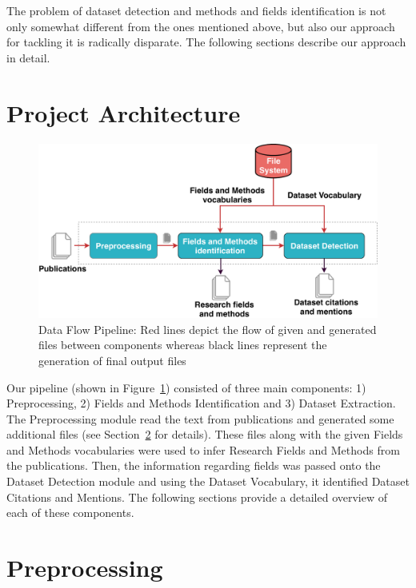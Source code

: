 \documentclass[runningheads]{llncs}
\begin{document}
The problem of dataset detection and methods and fields identification is not only somewhat different from the ones mentioned above, but also our approach for tackling it is radically disparate. The following sections describe our approach in detail.

\section{Project Architecture}

\begin{figure}[!htb]
    \centering
    \includegraphics[width=\textwidth]{images/flowchart_paper.pdf}
    \caption{Data Flow Pipeline: Red lines depict the flow of given and generated files between components whereas black lines represent the generation of final output files}
    \label{fig:flowchart}
\end{figure}

Our pipeline (shown in Figure~\ref{fig:flowchart}) consisted of three main components: 1) Preprocessing, 2) Fields and Methods Identification and 3) Dataset Extraction. The Preprocessing module read the text from publications and generated some additional files (see Section~\ref{preprocess} for details). These files along with the given Fields and Methods vocabularies were used to infer Research Fields and Methods from the publications. Then, the information regarding fields was passed onto the Dataset Detection module and using the Dataset Vocabulary, it identified Dataset Citations and Mentions. The following sections provide a detailed overview of each of these components.

\section{Preprocessing} \label{preprocess}
\end{document}
